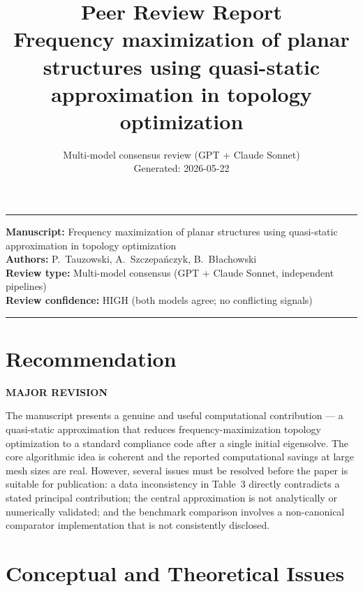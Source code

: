 \documentclass[11pt,a4paper]{article}
\title{\textbf{Peer Review Report}\\[0.4em]
\large Frequency maximization of planar structures using quasi-static\\
approximation in topology optimization}
\author{Multi-model consensus review (GPT + Claude Sonnet)\\
\small Generated: 2026-05-22}
\date{}
\begin{document}
\maketitle
\thispagestyle{empty}

\hrule
\vspace{0.5em}
\noindent\textbf{Manuscript:} Frequency maximization of planar structures using
quasi-static approximation in topology optimization\\
\noindent\textbf{Authors:} P.\ Tauzowski, A.\ Szczepańczyk, B.\ Błachowski\\
\noindent\textbf{Review type:} Multi-model consensus (GPT + Claude Sonnet, independent pipelines)\\
\noindent\textbf{Review confidence:} HIGH (both models agree; no conflicting signals)
\vspace{0.5em}
\hrule

\section*{Recommendation}

\textbf{MAJOR REVISION}

The manuscript presents a genuine and useful computational contribution ---
a quasi-static approximation that reduces frequency-maximization topology
optimization to a standard compliance code after a single initial
eigensolve. The core algorithmic idea is coherent and the reported
computational savings at large mesh sizes are real. However, several
issues must be resolved before the paper is suitable for publication:
a data inconsistency in Table~3 directly contradicts a stated principal
contribution; the central approximation is not analytically or
numerically validated; and the benchmark comparison involves a
non-canonical comparator implementation that is not consistently
disclosed.

\section{Conceptual and Theoretical Issues}
\end{document}
